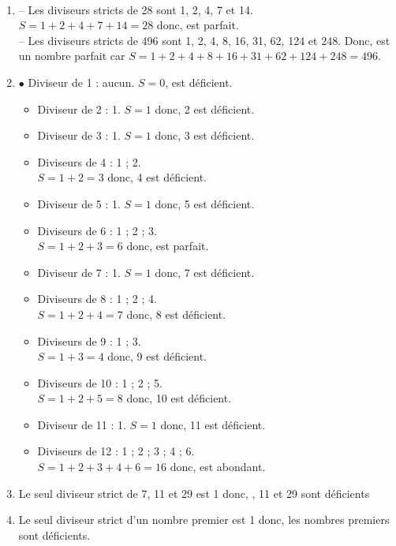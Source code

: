 \begin{colonne*exercice}
\begin{corrige}
   \ \\ [-5mm]
   \begin{enumerate}
      \item -- Les diviseurs stricts de 28 sont 1, 2, 4, 7 et 14. \\
         $S =1+2+4+7+14 =28$ donc, { est parfait}. \\
         -- Les diviseurs stricts de 496 sont 1, 2, 4, 8, 16, 31, 62, 124 et 248. Donc, { est un nombre parfait} car
         $S =1+2+4+8+16+31+62+124+248 =496$.
      \item \textcolor{G1}{$\bullet$} Diviseur de 1 : aucun. $S =0$, { est déficient}.
      \begin{itemize}
         \item Diviseur de 2 : 1. $S =1$ donc, 2 est déficient.
         \item Diviseur de 3 : 1. $S =1$ donc, 3 est déficient.
         \item Diviseurs de 4 : 1 ; 2. \\
            $S =1+2 =3$ donc, 4 est déficient.
         \item Diviseur de 5 : 1. $S =1$ donc, 5 est déficient.
         \item Diviseurs de 6 : 1 ; 2 ; 3. \\
            $S =1+2+3 =6$ donc, { est parfait}.
         \item Diviseur de 7 : 1. $S =1$ donc, 7 est déficient.
         \item Diviseurs de 8 : 1 ; 2 ; 4. \\
            $S =1+2+4 =7$ donc, 8 est déficient.
         \item Diviseurs de 9 : 1 ; 3. \\
            $S =1+3 =4$ donc, 9 est déficient.
         \item Diviseurs de 10 : 1 ; 2 ; 5. \\
            $S =1+2+5 =8$ donc, 10 est déficient.
         \item Diviseur de 11 : 1. $S =1$ donc, 11 est déficient.
         \item Diviseurs de 12 : 1 ; 2 ; 3 ; 4 ; 6. \\
            $S =1+2+3+4+6 =16$ donc, { est abondant}.
      \end{itemize}
      \item Le seul diviseur strict de 7, 11 et 29 est 1 donc, {, 11 et 29 sont déficients}
      \item Le seul diviseur strict d'un nombre premier est 1 donc, {\blue les nombres premiers sont déficients}.
   \end{enumerate}
\end{corrige}


\end{colonne*exercice}
